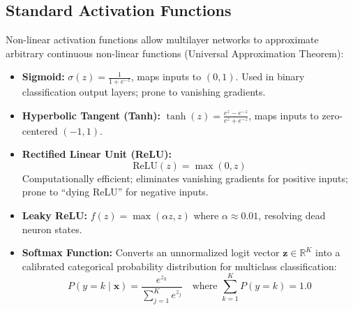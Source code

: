 \subsection{Standard Activation Functions}
Non-linear activation functions allow multilayer networks to approximate arbitrary continuous non-linear functions (Universal Approximation Theorem):
\begin{itemize}
    \item \textbf{Sigmoid:} $\sigma(z) = \frac{1}{1 + e^{-z}}$, maps inputs to $(0, 1)$. Used in binary classification output layers; prone to vanishing gradients.
    \item \textbf{Hyperbolic Tangent (Tanh):} $\tanh(z) = \frac{e^z - e^{-z}}{e^z + e^{-z}}$, maps inputs to zero-centered $(-1, 1)$.
    \item \textbf{Rectified Linear Unit (ReLU):}
    \begin{equation}
    \text{ReLU}(z) = \max(0, z)
    \end{equation}
    Computationally efficient; eliminates vanishing gradients for positive inputs; prone to ``dying ReLU'' for negative inputs.
    \item \textbf{Leaky ReLU:} $f(z) = \max(\alpha z, z)$ where $\alpha \approx 0.01$, resolving dead neuron states.
    \item \textbf{Softmax Function:} Converts an unnormalized logit vector $\mathbf{z} \in \mathbb{R}^K$ into a calibrated categorical probability distribution for multiclass classification:
    \begin{equation}
    \label{eq:softmax}
    P(y = k \mid \mathbf{x}) = \frac{e^{z_k}}{\sum_{j=1}^K e^{z_j}} \quad \text{where } \sum_{k=1}^K P(y=k) = 1.0
    \end{equation}
\end{itemize}

